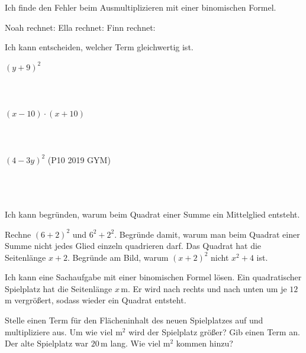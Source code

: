 \begin{aufgabe}{Ich finde den Fehler beim Ausmultiplizieren mit einer binomischen Formel.}
\begin{teile}
\teil Noah rechnet: 
\teil Ella rechnet: 
\teil Finn rechnet: 
\end{teile}
\end{aufgabe}

\begin{aufgabe}{Ich kann entscheiden, welcher Term gleichwertig ist.}
\begin{teile}
\teil $(y + 9)^2$ \\
 \\  \\  \\ 
\teil $(x - 10) \cdot (x + 10)$ \\
 \\  \\  \\ 
\teil $(4 - 3y)^2$ \quad (P10 2019 GYM) \\
 \\  \\  \\ 
\end{teile}
\end{aufgabe}

\begin{aufgabe}{Ich kann begründen, warum beim Quadrat einer Summe ein Mittelglied entsteht.}
\begin{teile}
\teil Rechne $(6 + 2)^2$ und $6^2 + 2^2$. Begründe damit, warum man beim Quadrat einer Summe nicht jedes Glied einzeln quadrieren darf.
\teil Das Quadrat hat die Seitenlänge $x + 2$. Begründe am Bild, warum $(x + 2)^2$ nicht $x^2 + 4$ ist.
\end{teile}


\end{aufgabe}

\begin{aufgabe}{Ich kann eine Sachaufgabe mit einer binomischen Formel lösen.}
Ein quadratischer Spielplatz hat die Seitenlänge $x$\,m. Er wird nach rechts und nach unten um je $12$\,m vergrößert, sodass wieder ein Quadrat entsteht.


\begin{teile}
\teil Stelle einen Term für den Flächeninhalt des neuen Spielplatzes auf und multipliziere aus.
\teil Um wie viel m$^2$ wird der Spielplatz größer? Gib einen Term an.
\teil Der alte Spielplatz war $20$\,m lang. Wie viel m$^2$ kommen hinzu?
\end{teile}
\end{aufgabe}
